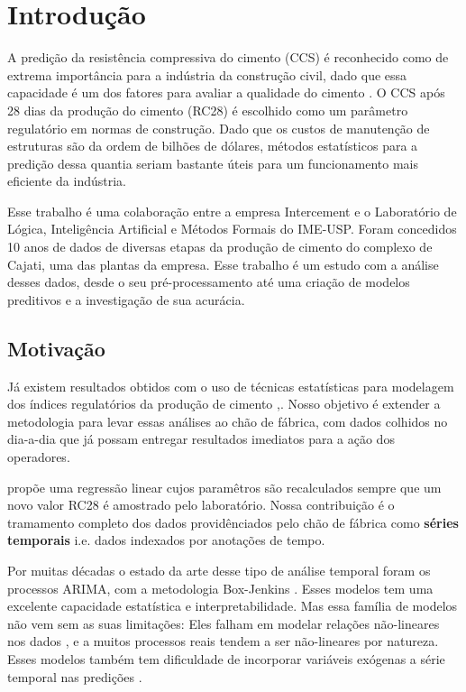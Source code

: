 \chapter{Introdução}
\label{cap:introducao}


A predição da resistência compressiva do cimento (CCS) é reconhecido como de
extrema importância para a indústria da construção civil, dado que essa
capacidade é um dos fatores para avaliar a qualidade do cimento
\citep{cementml}. O CCS após 28 dias da produção do cimento (RC28) é escolhido
 como um parâmetro regulatório em normas de construção. Dado que os custos de
 manutenção de estruturas são da ordem de bilhões de dólares, métodos
 estatísticos para a predição dessa quantia seriam bastante úteis para um
 funcionamento mais eficiente da indústria.

Esse trabalho é uma colaboração entre a empresa Intercement e o Laboratório de
Lógica, Inteligência Artificial e Métodos Formais do IME-USP. Foram concedidos
10 anos de dados de diversas etapas da produção de cimento do complexo de
Cajati, uma das plantas da empresa. Esse trabalho é um estudo com a análise
desses dados, desde o seu pré-processamento até uma criação de modelos
preditivos e a investigação de sua acurácia. \\


\section {Motivação}


Já existem resultados obtidos com o uso de técnicas estatísticas para modelagem
dos índices regulatórios da produção de cimento
\citep{cementlin},\citep{nncement}. Nosso objetivo é extender a metodologia para
levar essas análises ao chão de fábrica, com dados colhidos no dia-a-dia que já
possam entregar resultados imediatos para a ação dos operadores.

\cite{dynstat} propõe uma regressão linear cujos paramêtros são recalculados
sempre que um novo valor RC28 é amostrado pelo laboratório. Nossa contribuição é
o tramamento completo dos dados providênciados pelo chão de fábrica como
\textbf{séries temporais} i.e. dados indexados por anotações de tempo.

Por muitas décadas o estado da arte desse tipo de análise temporal foram os processos ARIMA, com a metodologia Box-Jenkins \citep{arima}. Esses modelos tem uma excelente capacidade estatística e interpretabilidade. Mas essa família de modelos não vem sem as suas limitações: Eles falham em modelar relações não-lineares nos dados \citep{forecasting}, e a muitos processos reais tendem a ser não-lineares por natureza. Esses modelos também tem dificuldade de incorporar variáveis exógenas a série temporal nas predições \cite{ubertime}.

